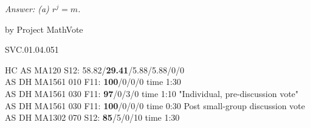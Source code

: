 {\it Answer: (a)  $r^j=m$.}

\medskip
by Project MathVote

SVC.01.04.051


HC AS MA120 S12: 58.82/{\bf29.41}/5.88/5.88/0/0  \\
AS DH MA1561 010 F11: {\bf 100}/0/0/0 time 1:30  \\
AS DH MA1561 030 F11: {\bf 97}/0/3/0 time 1:10 "Individual, pre-discussion vote" \\
AS DH MA1561 030 F11: {\bf 100}/0/0/0 time 0:30 Post small-group discussion vote \\
AS DH MA1302 070 S12: {\bf 85}/5/0/10 time 1:30  \\
